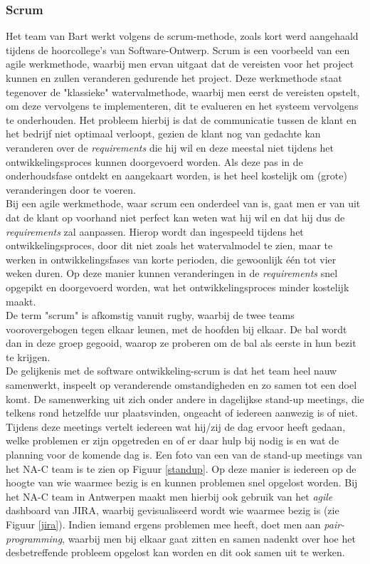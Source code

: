 \documentclass[10pt,a4paper]{article}
\begin{document}
\subsubsection{Scrum}
Het team van Bart werkt volgens de scrum-methode, zoals kort werd aangehaald tijdens de hoorcollege's van Software-Ontwerp. Scrum is een voorbeeld van een agile werkmethode, waarbij men ervan uitgaat dat de vereisten voor het project kunnen en zullen veranderen gedurende het project. Deze werkmethode staat tegenover de "klassieke" watervalmethode, waarbij men eerst de vereisten opstelt, om deze vervolgens te implementeren, dit te evalueren en het systeem vervolgens te onderhouden. Het probleem hierbij is dat de communicatie tussen de klant en het bedrijf niet optimaal verloopt, gezien de klant nog van gedachte kan veranderen over de \textit{requirements} die hij wil en deze meestal niet tijdens het ontwikkelingsproces kunnen doorgevoerd worden. Als deze pas in de onderhoudsfase ontdekt en aangekaart worden, is het heel kostelijk om (grote) veranderingen door te voeren.\\
Bij een agile werkmethode, waar scrum een onderdeel van is, gaat men er van uit dat de klant op voorhand niet perfect kan weten wat hij wil en dat hij dus de \textit{requirements} zal aanpassen. Hierop wordt dan ingespeeld tijdens het ontwikkelingsproces, door dit niet zoals het watervalmodel te zien, maar te werken in ontwikkelingsfases van korte perioden, die gewoonlijk \'e\'en tot vier weken duren. Op deze manier kunnen veranderingen in de \textit{requirements} snel opgepikt en doorgevoerd worden, wat het ontwikkelingsproces minder kostelijk maakt.\\
De term "scrum" is afkomstig vanuit rugby, waarbij de twee teams voorovergebogen tegen elkaar leunen, met de hoofden bij elkaar. De bal wordt dan in deze groep gegooid, waarop ze proberen om de bal als eerste in hun bezit te krijgen.\\
De gelijkenis met de software ontwikkeling-scrum is dat het team heel nauw samenwerkt, inspeelt op veranderende omstandigheden en zo samen tot een doel komt. De samenwerking uit zich onder andere in dagelijkse stand-up meetings, die telkens rond hetzelfde uur plaatsvinden, ongeacht of iedereen aanwezig is of niet. Tijdens deze meetings vertelt iedereen wat hij/zij de dag ervoor heeft gedaan, welke problemen er zijn opgetreden en of er daar hulp bij nodig is en wat de planning voor de komende dag is. Een foto van een van de stand-up meetings van het NA-C team is te zien op Figuur \ref{standup}. Op deze manier is iedereen op de hoogte van wie waarmee bezig is en kunnen problemen snel opgelost worden. Bij het NA-C team in Antwerpen maakt men hierbij ook gebruik van het \textit{agile} dashboard van JIRA, waarbij gevisualiseerd wordt wie waarmee bezig is (zie Figuur \ref{jira}). Indien iemand ergens problemen mee heeft, doet men aan \textit{pair-programming}, waarbij men bij elkaar gaat zitten en samen nadenkt over hoe het desbetreffende probleem opgelost kan worden en dit ook samen uit te werken.\\
\end{document}

